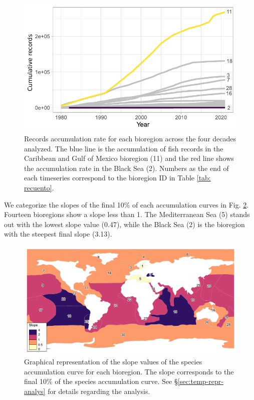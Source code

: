 \documentclass[12pt,authoryear]{elsarticle}
\begin{document}
\begin{figure}[h]
  \centering
  \includegraphics[width=.8\textwidth]{Fig_3}
  \caption{Records accumulation rate for each bioregion across the four decades analyzed. The blue line is the  accumulation of fish records  in the Caribbean and Gulf of Mexico bioregion (11) and the red line shows the accumulation rate in the Black Sea (2). Numbers as the end of each timeseries correspond to the bioregion ID in Table \ref{tab: recuento}.}
  \label{fig:record-accumlation}
\end{figure}

We categorize the slopes of the final 10\% of each accumulation curves  in Fig. \ref{fig:Slopefinal}. Fourteen bioregions show a slope less than 1. The Mediterranean Sea (5) stands out with the lowest slope value (0.47), while the Black Sea (2) is the bioregion with the steepest final slope (3.13). 

\begin{figure}
  \centering
  \includegraphics[width=\textwidth]{Fig_4}
    \caption{Graphical representation of the slope values of the species accumulation curve  for each bioregion. The slope corresponds to the final 10\%  of the species accumulation curve. See \S \ref{sec:temp-repr-analys} for details regarding the analysis.}
     \label{fig:Slopefinal}
\end{figure}
\end{document}
